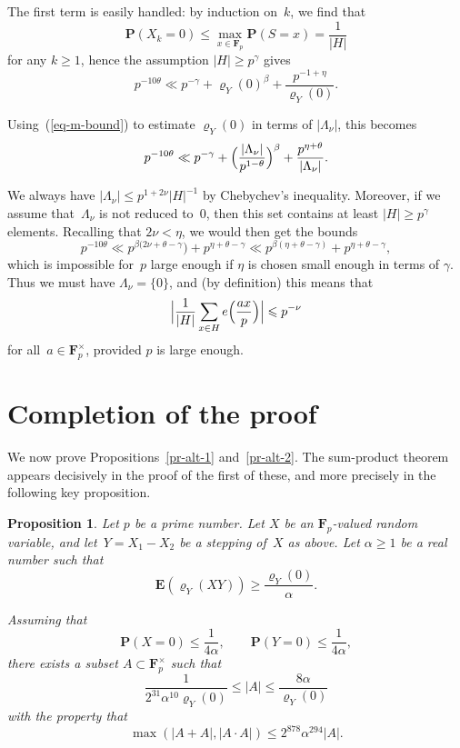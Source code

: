\documentclass[12pt]{amsart}
\renewcommand{\leq}{\leqslant}
\renewcommand{\geq}{\geqslant}
\numberwithin{equation}{section}
\newcommand{\Ff}{\mathbf{F}}
\newcommand{\proba}{\mathbf{P}}
\newcommand{\expect}{\mathbf{E}}
\renewcommand{\rho}{\varrho}
\theoremstyle{plain}
\newtheorem{proposition}[theorem]{Proposition}
\theoremstyle{remark}
\theoremstyle{definition}
\renewcommand{\geq}{\geqslant}
\renewcommand{\leq}{\leqslant}
\begin{document}
The first term is easily handled: by induction on~$k$, we find that
$$
\proba(X_k=0)\leq \max_{x\in\Ff_p}\proba(S=x)=\frac{1}{|H|}
$$
for any $k\geq 1$, hence the assumption $|H|\geq p^{\gamma}$ gives
$$
p^{-10\theta}\ll p^{-\gamma}+\rho_Y(0)^{\beta}+
\frac{p^{-1+\eta}}{\rho_Y(0)}.
$$

Using~(\ref{eq-m-bound}) to estimate $\rho_Y(0)$ in terms of
$|\Lambda_{\nu}|$, this becomes
$$
p^{-10\theta}\ll
p^{-\gamma}+\Bigl(\frac{|\Lambda_{\nu}|}{p^{1-\theta}}\Bigr)^{\beta}
+\frac{p^{\eta+\theta}}{|\Lambda_{\nu}|}.
$$

We always have $|\Lambda_{\nu}|\leq p^{1+2\nu}|H|^{-1}$ by Chebychev's
inequality. Moreover, if we assume that~$\Lambda_{\nu}$ is not reduced
to~$0$, then this set contains at least $|H|\geq p^{\gamma}$
elements. Recalling that $2\nu<\eta$, we would then get the bounds
$$
p^{-10\theta}\ll p^{\beta(2\nu+\theta-\gamma})+p^{\eta+\theta-\gamma} 
\ll p^{\beta(\eta+\theta-\gamma)}+p^{\eta+\theta-\gamma},
$$
which is impossible for~$p$ large enough if $\eta$ is chosen small
enough in terms of $\gamma$.  Thus we must have $\Lambda_{\nu}=\{0\}$,
and (by definition) this means that
$$
\Bigl|\frac{1}{|H|}\sum_{x\in H}e\Bigl(\frac{ax}{p}\Bigr)\Bigr|\leq
p^{-\nu}
$$
for all~$a\in\Ff_p^{\times}$, provided $p$ is large enough.


\section{Completion of the proof}

We now prove Propositions~\ref{pr-alt-1} and~\ref{pr-alt-2}. The
sum-product theorem appears decisively in the proof of the first of
these, and more precisely in the following key proposition.

\begin{proposition}\label{pr-exp-1}
  Let $p$ be a prime number. Let $X$ be an $\Ff_p$-valued random
  variable, and let~$Y=X_1-X_2$ be a stepping of~$X$ as above. Let
  $\alpha\geq 1$ be a real number such that
  \begin{equation}\label{eq-bgk-cond2}
    \expect(\rho_Y(XY))\geq \frac{\rho_Y(0)}{\alpha}.
  \end{equation}

  Assuming that
  \begin{equation}\label{eq-bgk-cond1}
    \proba(X=0)\leq \frac{1}{4\alpha},\quad\quad \proba(Y=0)\leq
    \frac{1}{4\alpha},
  \end{equation}
  there exists a subset $A\subset \Ff_p^{\times}$ such that
  $$
  \frac{1}{2^{31}\alpha^{10} \rho_Y(0)}\leq |A|\leq
  \frac{8\alpha }{\rho_Y(0)}
  $$
  with the property that
  $$
  \max(|A+A|,|A\cdot A|)\leq 2^{878}\alpha^{294}|A|.
  $$
\end{proposition}
\end{document}
